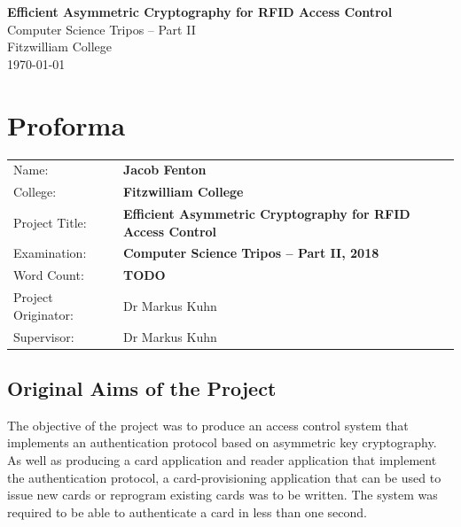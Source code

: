 \documentclass[12pt,a4paper,twoside,openright]{report}
\begin{document}





\pagestyle{empty}


\vspace*{60mm}
\begin{center}
\Huge
\textbf{Efficient Asymmetric Cryptography for RFID Access Control} \\[5mm]
Computer Science Tripos -- Part II \\[5mm]
Fitzwilliam College \\[5mm]
\today  %
\end{center}


\pagestyle{plain}

\chapter*{Proforma}

{\large
\begin{tabularx}{\linewidth}{l X}
Name:               & \bf Jacob Fenton                       \\
College:            & \bf Fitzwilliam College                     \\
Project Title:      & \bf Efficient Asymmetric Cryptography for RFID Access Control \\
Examination:        & \bf Computer Science Tripos -- Part II, 2018  \\
Word Count:         & \bf TODO  \\
Project Originator: & Dr Markus Kuhn                    \\
Supervisor:         & Dr Markus Kuhn                    \\ 
\end{tabularx}
}

\section*{Original Aims of the Project}

The objective of the project was to produce an access control system that implements an authentication protocol based on asymmetric key cryptography. As well as producing a card application and reader application that implement the authentication protocol, a card-provisioning application that can be used to issue new cards or reprogram existing cards was to be written. The system was required to be able to authenticate a card in less than one second.
\end{document}

